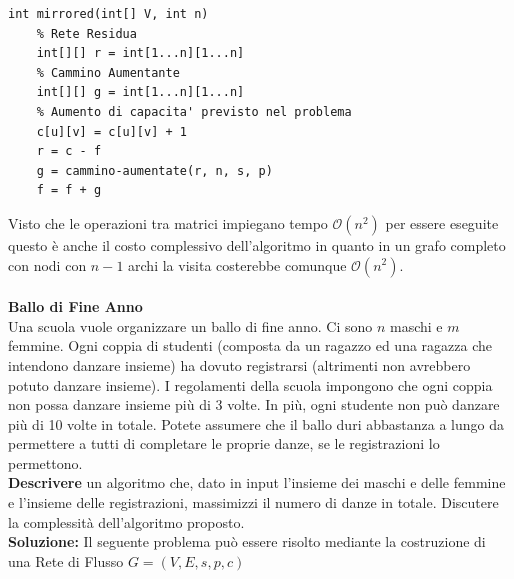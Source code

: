 \documentclass[../cheatSheetAlgoritmi.tex]{subfiles}
\begin{document}
\newpage
\begin{lstlisting}[caption=Aggiornamento Flusso Massimo]
int mirrored(int[] V, int n)
	% Rete Residua
	int[][] r = int[1...n][1...n]
	% Cammino Aumentante
	int[][] g = int[1...n][1...n]
	% Aumento di capacita' previsto nel problema 
	c[u][v] = c[u][v] + 1
	r = c - f
	g = cammino-aumentate(r, n, s, p)
	f = f + g
\end{lstlisting}
Visto che le operazioni tra matrici impiegano tempo $\mathcal{O}(n^{2})$ per essere eseguite questo è anche il costo complessivo dell'algoritmo in quanto in un grafo completo con nodi con $n-1$ archi la visita costerebbe comunque $\mathcal{O}(n^{2})$.\\\\
\textbf{Ballo di Fine Anno}\\
Una scuola vuole organizzare un ballo di fine anno. Ci sono $n$ maschi e $m$ femmine. Ogni coppia di studenti (composta da un ragazzo ed una ragazza che intendono danzare insieme) ha dovuto registrarsi (altrimenti non avrebbero potuto danzare insieme). I regolamenti della scuola impongono che ogni coppia non possa danzare insieme più di 3 volte. In più, ogni studente non può danzare più di 10 volte in totale. Potete assumere che il ballo duri abbastanza a lungo da permettere a tutti di completare le proprie danze, se le registrazioni lo permettono.\\
\textbf{Descrivere} un algoritmo che, dato in input l’insieme dei maschi e delle femmine e l’insieme delle registrazioni, massimizzi il numero di danze in totale. Discutere la complessità dell’algoritmo proposto.\\
\textbf{Soluzione:} Il seguente problema può essere risolto mediante la costruzione di una Rete di Flusso $G = (V, E, s, p, c)$
\end{document}
